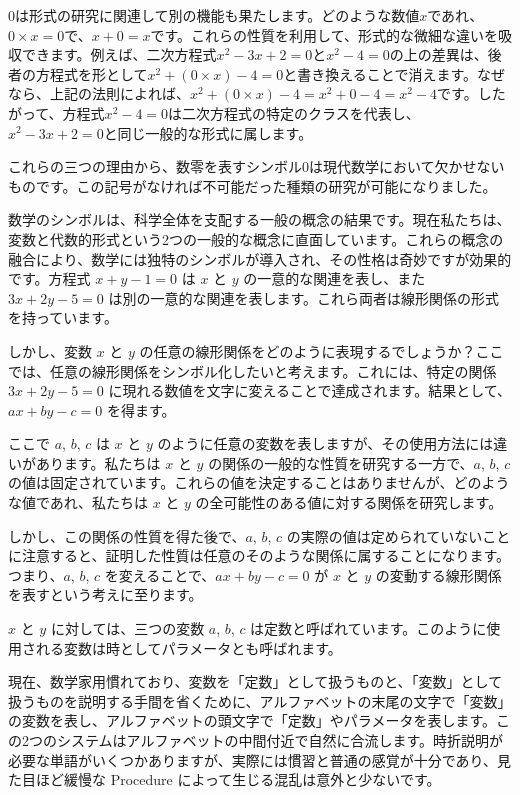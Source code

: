 \documentclass[a4paper,11pt,openany]{ltjsbook}
\begin{document}
$0$は形式の研究に関連して別の機能も果たします。どのような数値$x$であれ、$0 × x = 0$で、$x + 0 = x$です。これらの性質を利用して、形式的な微細な違いを吸収できます。例えば、二次方程式$x^{2} - 3x + 2 = 0$と$x^{2} - 4 = 0$の上の差異は、後者の方程式を形として$x^{2} + (0 × x) - 4 = 0$と書き換えることで消えます。なぜなら、上記の法則によれば、$x^{2} + (0 × x) - 4 = x^{2} + 0 - 4 = x^{2} - 4$です。したがって、方程式$x^{2} - 4 = 0$は二次方程式の特定のクラスを代表し、$x^{2} - 3x + 2 = 0$と同じ一般的な形式に属します。

これらの三つの理由から、数零を表すシンボル$0$は現代数学において欠かせないものです。この記号がなければ不可能だった種類の研究が可能になりました。

数学のシンボルは、科学全体を支配する一般の概念の結果です。現在私たちは、変数と代数的形式という2つの一般的な概念に直面しています。これらの概念の融合により、数学には独特のシンボルが導入され、その性格は奇妙ですが効果的です。方程式 $x + y - 1 = 0$ は $x$ と $y$ の一意的な関連を表し、また $3x + 2y - 5 = 0$ は別の一意的な関連を表します。これら両者は線形関係の形式を持っています。

しかし、変数 $x$ と $y$ の任意の線形関係をどのように表現するでしょうか？ここでは、任意の線形関係をシンボル化したいと考えます。これには、特定の関係 $3x + 2y - 5 = 0$ に現れる数値を文字に変えることで達成されます。結果として、$ax + by - c = 0$ を得ます。

ここで $a$, $b$, $c$ は $x$ と $y$ のように任意の変数を表しますが、その使用方法には違いがあります。私たちは $x$ と $y$ の関係の一般的な性質を研究する一方で、$a$, $b$, $c$ の値は固定されています。これらの値を決定することはありませんが、どのような値であれ、私たちは $x$ と $y$ の全可能性のある値に対する関係を研究します。

しかし、この関係の性質を得た後で、$a$, $b$, $c$ の実際の値は定められていないことに注意すると、証明した性質は任意のそのような関係に属することになります。つまり、$a$, $b$, $c$ を変えることで、$ax + by - c = 0$ が $x$ と $y$ の変動する線形関係を表すという考えに至ります。

$x$ と $y$ に対しては、三つの変数 $a$, $b$, $c$ は定数と呼ばれています。このように使用される変数は時としてパラメータとも呼ばれます。

現在、数学家用慣れており、変数を「定数」として扱うものと、「変数」として扱うものを説明する手間を省くために、アルファベットの末尾の文字で「変数」の変数を表し、アルファベットの頭文字で「定数」やパラメータを表します。この2つのシステムはアルファベットの中間付近で自然に合流します。時折説明が必要な単語がいくつかありますが、実際には慣習と普通の感覚が十分であり、見た目ほど緩慢な Procedure によって生じる混乱は意外と少ないです。
\end{document}
